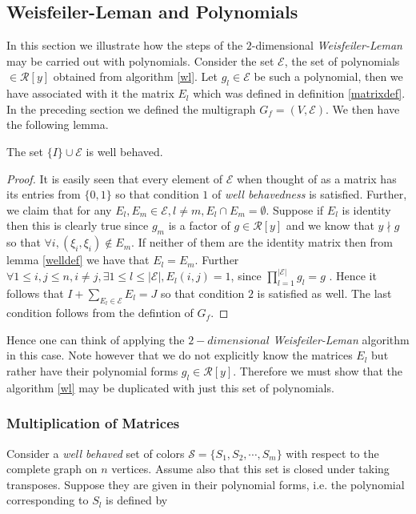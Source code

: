 \subsection{Weisfeiler-Leman and Polynomials}
	In this section we illustrate how the steps of the $2$-dimensional \emph{Weisfeiler-Leman} may be carried out with polynomials. Consider the set $\mathcal{E}$, the set of polynomials $\in \mathcal{R}[y]$ obtained
	from algorithm \ref{wl}. Let $g_l \in \mathcal{E}$ be such a polynomial, then we have associated with it the matrix $E_l$ which was defined in definition \ref{matrixdef}.
        In the preceding section we defined the multigraph $G_f=(V,\mathcal{E})$. We then have the following lemma.

	\begin{lemma}
		The set $\{I\} \cup \mathcal{E}$ is well behaved.
	\end{lemma}


	\begin{proof}
		It is easily seen that every element of $\mathcal{E}$ when thought of as a matrix has its entries from $\{0,1\}$ so that condition $1$ of \emph{well behavedness} is satisfied. Further, we claim that for 
		any $E_l,E_m \in \mathcal{E},l\neq m, E_l \cap E_m = \emptyset$. Suppose if $E_l$ is identity then this is clearly true since $g_m$ is a factor of $g \in \mathcal{R}[y]$ and we know that $y \nmid g$ so that
		$\forall i,(\xi_i,\xi_i) \notin
		E_m$. If neither of them are the
		identity matrix then from lemma \ref{welldef} we have that $E_l=E_m$. Further $\forall 1 \le i,j \le n,i\neq j,\exists 1 \le l \le |\mathcal{E}|, E_l(i,j)=1$, since $\prod_{l=1}^{|\mathcal{E}|}g_l=g$
		. Hence it follows that $I+\sum_{E_l \in \mathcal{E}}E_l=J$ so that condition $2$ is satisfied as well. The last condition follows from the defintion of $G_f$.
	\end{proof}


	Hence one can think of applying the $2-dimensional$ \emph{Weisfeiler-Leman} algorithm in this case. Note however that we do not explicitly know the matrices $E_l$ but rather have their polynomial forms $g_l \in \mathcal{R}[y]$.
	Therefore we must show that the algorithm \ref{wl} may be duplicated with just this set of polynomials.

	\subsubsection{Multiplication of Matrices}
	Consider a \emph{well behaved} set of colors $\mathcal{S}=\{S_1,S_2,\cdots,S_m\}$ with respect to the complete graph on $n$ vertices. Assume also that this set is closed under taking transposes.	
	Suppose they are given in their polynomial forms, i.e. the polynomial corresponding to $S_l$ is 
	defined by 

